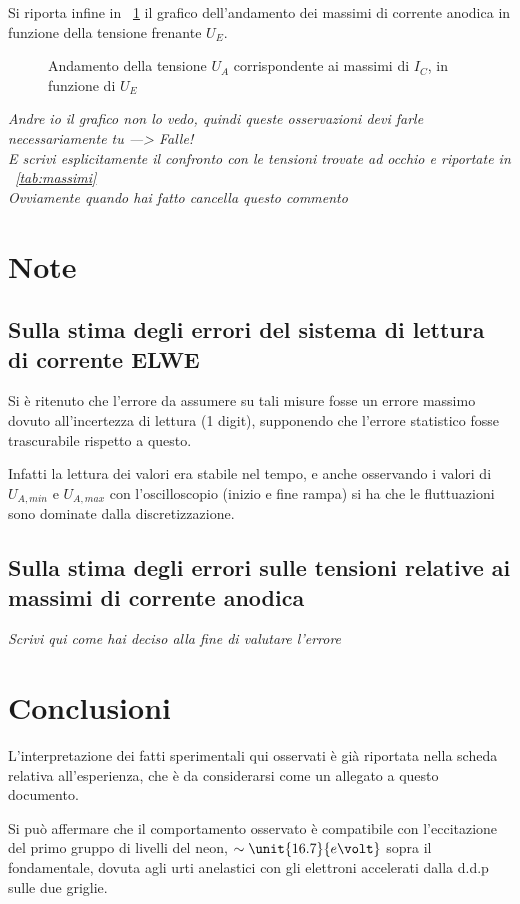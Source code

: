\documentclass[10pt,a4paper]{article}
\begin{document}

Si riporta infine in \figurename{~\ref{fig:final}} il grafico dell'andamento dei massimi di corrente anodica in funzione della tensione frenante $U_E$.

\begin{figure}[h!]
	\centering
	\caption{Andamento della tensione $U_A$ corrispondente ai massimi di $I_C$, in funzione di $U_E$}
	\label{fig:final}
\end{figure}

\emph{\LARGE Andre io il grafico non lo vedo, quindi queste osservazioni devi farle necessariamente tu ---> Falle! \\	
E scrivi esplicitamente il confronto con le tensioni trovate ad occhio e riportate in \tablename{~\ref{tab:massimi}} \\
Ovviamente quando hai fatto cancella questo commento}

\section{Note}

\subsection{Sulla stima degli errori del sistema di lettura di corrente ELWE}
\label{errELWE}
Si è ritenuto che l'errore da assumere su tali misure fosse un errore massimo dovuto all'incertezza di lettura (1 digit), supponendo che l'errore statistico fosse trascurabile rispetto a questo.

Infatti la lettura dei valori era stabile nel tempo, e anche osservando i valori di $U_{A, min}$ e $U_{A, max}$ con l'oscilloscopio (inizio e fine rampa) si ha che le fluttuazioni sono dominate dalla discretizzazione.

\subsection{Sulla stima degli errori sulle tensioni relative ai massimi di corrente anodica}

\emph{\LARGE Scrivi qui come hai deciso alla fine di valutare l'errore}


\section{Conclusioni}
L'interpretazione dei fatti sperimentali qui osservati è già riportata nella scheda relativa all'esperienza, che è da considerarsi come un allegato a questo documento.

Si può affermare che il comportamento osservato è compatibile con l'eccitazione del primo gruppo di livelli del neon, $\sim \unit{16.7}{e\volt}$ sopra il fondamentale, dovuta agli urti anelastici con gli elettroni accelerati dalla d.d.p sulle due griglie.
\end{document}

